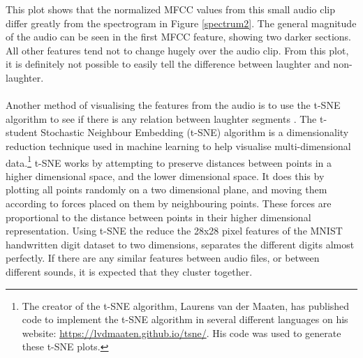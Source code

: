 \documentclass[a4paper,11pt,notitlepage]{article}
\begin{document}
This plot shows that the normalized MFCC values from this small audio clip differ greatly from the spectrogram in Figure \ref{spectrum2}. The general magnitude of the audio can be seen in the first MFCC feature, showing two darker sections. All other features tend not to change hugely over the audio clip. From this plot, it is definitely not possible to easily tell the difference between laughter and non-laughter.\\
\\

Another method of visualising the features from the audio is to use the t-SNE algorithm to see if there is any relation between laughter segments \cite{maaten2008visualizing}. The t-student Stochastic Neighbour Embedding (t-SNE) algorithm is a dimensionality reduction technique used in machine learning to help visualise multi-dimensional data.\footnote{The creator of the t-SNE algorithm, Laurens van der Maaten, has published code to implement the t-SNE algorithm in several different languages on his website: \url{https://lvdmaaten.github.io/tsne/}. His code was used to generate these t-SNE plots.} t-SNE works by attempting to preserve distances between points in a higher dimensional space, and the lower dimensional space. It does this by plotting all points randomly on a two dimensional plane, and moving them according to forces placed on them by neighbouring points. These forces are proportional to the distance between points in their higher dimensional representation. Using t-SNE the reduce the 28x28 pixel features of the MNIST handwritten digit dataset to two dimensions, separates the different digits almost perfectly. If there are any similar features between audio files, or between different sounds, it is expected that they cluster together.
\end{document}
